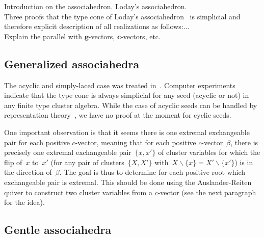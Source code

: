\documentclass{amsart}
\theoremstyle{definition}
\renewcommand{\b}[1]{{\boldsymbol{#1}}} %
\newcommand{\ssm}{\smallsetminus} %
\newcommand{\vincent}[1]{\todo[color=blue!30]{#1 \\ \hfill --- V.}}
\begin{document}
Introduction on the associahedron. Loday's associahedron. \\
Three proofs that the type cone of Loday's associahedron~\cite{Loday} is simplicial and therefore explicit description of all realizations as follows:...\\
Explain the parallel with $\b{g}$-vectors, $\b{c}$-vectors, etc.
\vincent{TODO}

\subsection{Generalized associahedra}

The acyclic and simply-laced case was treated in~\cite{BazierMatteDouvilleMousavandThomasYildirim}.
Computer experiments indicate that the type cone is always simplicial for any seed (acyclic or not) in any finite type cluster algebra.
While the case of acyclic seeds can be handled by representation theory~\cite{BazierMatteDouvilleMousavandThomasYildirim}, we have no proof at the moment for cyclic seeds.

One important observation is that it seems there is one extremal exchangeable pair for each positive $c$-vector, meaning that for each positive $c$-vector~$\beta$, there is precisely one extremal exchangeable pair~$\{x,x'\}$ of cluster variables for which the flip of~$x$ to~$x'$ (for any pair of clusters~$\{X,X'\}$ with~$X \ssm \{x\} = X' \ssm \{x'\}$) is in the direction of~$\beta$.
The goal is thus to determine for each positive root which exchangeable pair is extremal.
This should be done using the Auslander-Reiten quiver to construct two cluster variables from a $c$-vector (see the next paragraph for the idea).

\subsection{Gentle associahedra}
\end{document}
